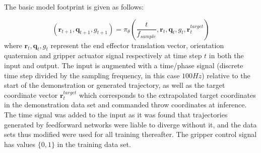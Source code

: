 \documentclass{article}
\begin{document}
The basic model footprint is given as follows:

\begin{equation}
	(\boldsymbol{r}_{t+1}, \boldsymbol{q}_{t+1}, g_{t+1}) = \pi_{\theta}\left(\frac{t}{f_{sample}}, \boldsymbol{r}_{t}, \boldsymbol{q}_{t}, g_{t}, \boldsymbol{r}^{target}_t \right)
\end{equation}
where $\boldsymbol{r}_{t}, \boldsymbol{q}_{t}, g_{t}$ represent the end effector translation vector, orientation quaternion and gripper actuator signal respectively at time step $t$ in both the input and output. The input is augmented with a time/phase signal (discrete time step divided by the sampling frequency, in this case $100Hz$) relative to the start of the demonstration or generated trajectory, as well as the target coordinate vector $\boldsymbol{r}^{target}_t$ which corresponds to the extrapolated target coordinates in the demonstration data set and commanded throw coordinates at inference. The time signal was added to the input as it was found that trajectories generated by feedforward networks were liable to diverge without it, and the data sets thus modified were used for all training thereafter. The gripper control signal has values $\lbrace 0,1 \rbrace$ in the training data set.
\end{document}
